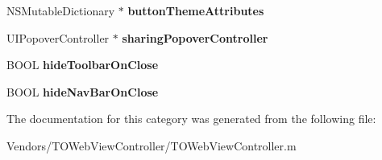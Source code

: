 \begin{DoxyCompactItemize}
\item 
\hypertarget{category_t_o_web_view_controller_07_08_a597847621f01fa4c982db2aa48975de2}{}N\+S\+Mutable\+Dictionary $\ast$ {\bfseries button\+Theme\+Attributes}\label{category_t_o_web_view_controller_07_08_a597847621f01fa4c982db2aa48975de2}

\item 
\hypertarget{category_t_o_web_view_controller_07_08_ae1c38ef46bbf79a97804e93df51735fe}{}U\+I\+Popover\+Controller $\ast$ {\bfseries sharing\+Popover\+Controller}\label{category_t_o_web_view_controller_07_08_ae1c38ef46bbf79a97804e93df51735fe}

\item 
\hypertarget{category_t_o_web_view_controller_07_08_a6803bde56104113ddb6ca9b3978eea91}{}B\+O\+O\+L {\bfseries hide\+Toolbar\+On\+Close}\label{category_t_o_web_view_controller_07_08_a6803bde56104113ddb6ca9b3978eea91}

\item 
\hypertarget{category_t_o_web_view_controller_07_08_aea1631d7caea88836ba706c641537633}{}B\+O\+O\+L {\bfseries hide\+Nav\+Bar\+On\+Close}\label{category_t_o_web_view_controller_07_08_aea1631d7caea88836ba706c641537633}

\end{DoxyCompactItemize}


The documentation for this category was generated from the following file\+:\begin{DoxyCompactItemize}
\item 
Vendors/\+T\+O\+Web\+View\+Controller/T\+O\+Web\+View\+Controller.\+m\end{DoxyCompactItemize}
